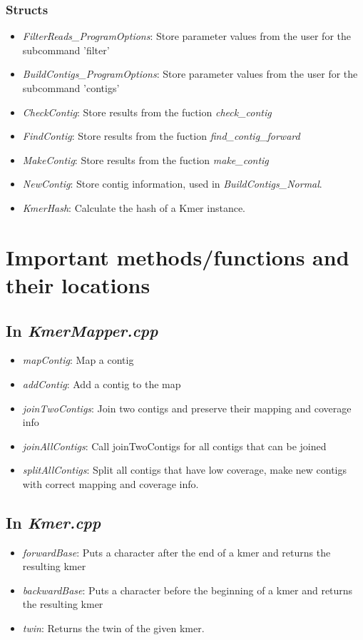 \documentclass[a4paper]{report}
\renewcommand{\i}[1]{\textit{#1}}  %
\begin{document}
\subsection{Structs}
\begin{itemize}
\item \i{FilterReads\_ProgramOptions}: Store parameter values from the user for the subcommand 'filter'
\item \i{BuildContigs\_ProgramOptions}: Store parameter values from the user for the subcommand 'contigs'
\item \i{CheckContig}: Store results from the fuction \i{check\_contig}
\item \i{FindContig}: Store results from the fuction \i{find\_contig\_forward}  
\item \i{MakeContig}: Store results from the fuction \i{make\_contig}
\item \i{NewContig}: Store contig information, used in \i{BuildContigs\_Normal}.
\item \i{KmerHash}: Calculate the hash of a Kmer instance.
\end{itemize}

\chapter{Important methods/functions and their locations}

\section{In \i{KmerMapper.cpp}}
\begin{itemize}
\item \i{mapContig}: Map a contig
\item \i{addContig}: Add a contig to the map
\item \i{joinTwoContigs}: Join two contigs and preserve their mapping and coverage info
\item \i{joinAllContigs}: Call joinTwoContigs for all contigs that can be joined
\item \i{splitAllContigs}: Split all contigs that have low coverage, make new contigs with correct mapping and coverage info.
\end{itemize}

\section{In \i{Kmer.cpp}}

\begin{itemize}
\item \i{forwardBase}: Puts a character after the end of a kmer and returns the resulting kmer
\item \i{backwardBase}: Puts a character before the beginning of a kmer and returns the resulting kmer
\item \i{twin}: Returns the twin of the given kmer.
\end{itemize}
\end{document}

